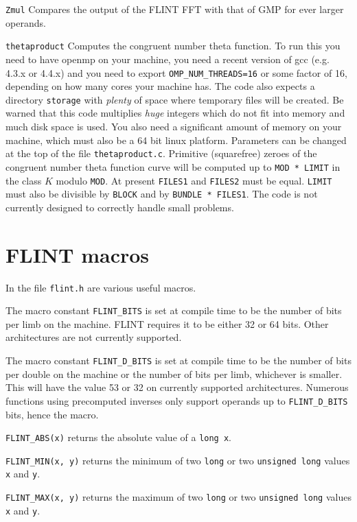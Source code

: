 \documentclass[a4paper,10pt]{book}
\newcommand{\code}{\lstinline}
\begin{document}
\code{Zmul}  Compares the output of the FLINT FFT with that of GMP for ever 
larger operands.

\code{thetaproduct}  Computes the congruent number theta function.  To run 
this you need to have openmp on your machine, you need a recent version of 
gcc (e.g. 4.3.x or 4.4.x) and you need to export \code{OMP_NUM_THREADS=16} 
or some factor of 16, depending on how many cores your machine has.  The 
code also expects a directory \code{storage} with \emph{plenty} of space 
where temporary files will be created.  Be warned that this code multiplies 
\emph{huge} integers which do not fit into memory and much disk space is 
used.  You also need a significant amount of memory on your machine, which 
must also be a 64 bit linux platform.  Parameters can be changed at the top 
of the file \code{thetaproduct.c}.  Primitive (squarefree) zeroes of the 
congruent number theta function curve will be computed up to 
\code{MOD * LIMIT} in the class $K$ modulo \code{MOD}.  At present 
\code{FILES1} and \code{FILES2} must be equal.  \code{LIMIT} must also be 
divisible by \code{BLOCK} and by \code{BUNDLE * FILES1}.  The code is not 
currently designed to correctly handle small problems. 

\section{FLINT macros}

In the file \code{flint.h} are various useful macros.

The macro constant \code{FLINT_BITS} is set at compile time to be the 
number of bits per limb on the machine.  FLINT requires it to be either 
32 or 64 bits.  Other architectures are not currently supported.

The macro constant \code{FLINT_D_BITS} is set at compile time to be the 
number of bits per double on the machine or the number of bits per limb, 
whichever is smaller.  This will have the value 53 or 32 on currently 
supported architectures.  Numerous functions using precomputed inverses 
only support operands up to \code{FLINT_D_BITS} bits, hence the macro.

\code{FLINT_ABS(x)} returns the absolute value of a \code{long x}.

\code{FLINT_MIN(x, y)} returns the minimum of two \code{long} or two 
\code{unsigned long} values \code{x} and \code{y}.

\code{FLINT_MAX(x, y)} returns the maximum of two \code{long} or two 
\code{unsigned long} values \code{x} and \code{y}.
\end{document}
